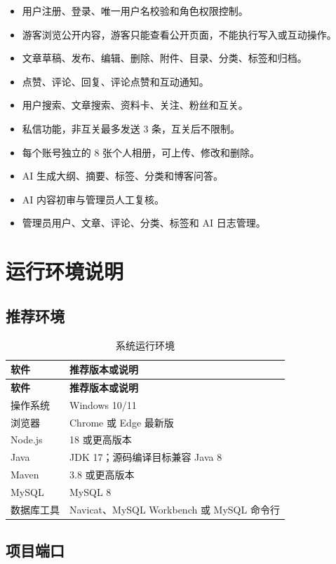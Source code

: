 \documentclass[UTF8,a4paper,12pt]{ctexart}
\begin{document}
\begin{itemize}
  \item 用户注册、登录、唯一用户名校验和角色权限控制。
  \item 游客浏览公开内容，游客只能查看公开页面，不能执行写入或互动操作。
  \item 文章草稿、发布、编辑、删除、附件、目录、分类、标签和归档。
  \item 点赞、评论、回复、评论点赞和互动通知。
  \item 用户搜索、文章搜索、资料卡、关注、粉丝和互关。
  \item 私信功能，非互关最多发送 3 条，互关后不限制。
  \item 每个账号独立的 8 张个人相册，可上传、修改和删除。
  \item AI 生成大纲、摘要、标签、分类和博客问答。
  \item AI 内容初审与管理员人工复核。
  \item 管理员用户、文章、评论、分类、标签和 AI 日志管理。
\end{itemize}

\section{运行环境说明}

\subsection{推荐环境}

\begin{longtable}{p{4cm}p{9.5cm}}
\caption{系统运行环境}\\
\toprule
\rowcolor{tablehead}\textbf{软件} & \textbf{推荐版本或说明}\\
\midrule
\endfirsthead
\toprule
\rowcolor{tablehead}\textbf{软件} & \textbf{推荐版本或说明}\\
\midrule
\endhead
操作系统 & Windows 10/11\\
浏览器 & Chrome 或 Edge 最新版\\
Node.js & 18 或更高版本\\
Java & JDK 17；源码编译目标兼容 Java 8\\
Maven & 3.8 或更高版本\\
MySQL & MySQL 8\\
数据库工具 & Navicat、MySQL Workbench 或 MySQL 命令行\\
\bottomrule
\end{longtable}

\subsection{项目端口}
\end{document}
